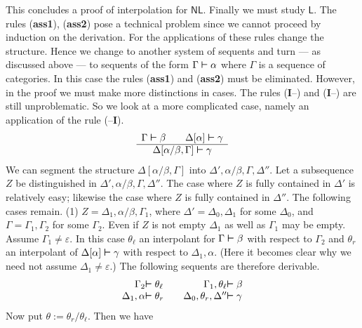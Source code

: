 This concludes a proof of interpolation for $\mathsf{NL}$.
Finally we must study $\mathsf{L}$. The rules (\textbf{ass1}), 
(\textbf{ass2}) pose a technical problem since we cannot 
proceed by induction on the derivation. For the applications 
of these rules change the structure. Hence we change to another 
system of sequents and turn --- as discussed above --- to 
sequents of the form $\Gamma \boldsymbol{\vdash} \alpha$ where $\Gamma$ is 
a sequence of categories.
In this case the rules (\textbf{ass1}) and (\textbf{ass2}) must be
eliminated. However, in the proof we must make more distinctions
in cases. The rules (\textbf{I}--{\mtt{\tf}}) and (\textbf{I}--{\mtt{\tb}})
are still unproblematic. So we look at a more complicated case,
namely an application of the rule ({\mtt{\tf}}--\textbf{I}).
\begin{equation}
\begin{array}{c}
\Gamma \boldsymbol{\vdash} \beta \qquad \Delta[\alpha] \boldsymbol{\vdash} \gamma
\\\hline
\Delta[\alpha/\beta, \Gamma] \boldsymbol{\vdash} \gamma
\end{array}
\end{equation}
We can segment the structure $\Delta[\alpha/\beta, \Gamma]$
into $\Delta', \alpha/\beta, \Gamma, \Delta''$.
Let a subsequence $Z$ be distinguished in $\Delta', \alpha/\beta, \Gamma,
\Delta''$. The case where $Z$ is fully contained in $\Delta'$
is relatively easy; likewise the case where $Z$ is fully contained
in $\Delta''$. The following cases remain.
(1) $Z = \Delta_1, \alpha/\beta, \Gamma_1$,
where $\Delta' = \Delta_0, \Delta_1$ for some $\Delta_0$,
and $\Gamma = \Gamma_1, \Gamma_2$ for some $\Gamma_2$.
Even if $Z$ is not empty $\Delta_1$ as well as
$\Gamma_1$ may be empty. Assume  $\Gamma_1 \neq \varepsilon$.
In this case $\theta_{\ell}$ an interpolant
for $\Gamma \boldsymbol{\vdash} \beta$ with respect to $\Gamma_2$ and
$\theta_r$ an interpolant of $\Delta[\alpha] \boldsymbol{\vdash} \gamma$
with respect to $\Delta_1, \alpha$. (Here it becomes clear why we
need not assume $\Delta_1 \neq \varepsilon$.)
The following sequents are therefore derivable.
\begin{equation}
\begin{array}{r@{}l@{\qquad}r@{}l}
\Gamma_2 & \bvdash \theta_{\ell} & \Gamma_1, \theta_{\ell} & \bvdash \beta \\
\Delta_1, \alpha & \bvdash \theta_r & \Delta_0, \theta_r, \Delta''
    & \bvdash \gamma
\end{array}
\end{equation}
Now put $\theta := \theta_r/\theta_{\ell}$. Then we have
